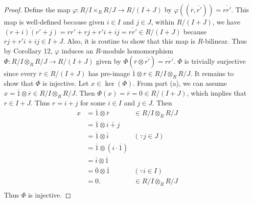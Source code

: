 \documentclass{article}
\begin{document}
\begin{enumerate}[label={(\alph*)}]
      \begin{proof}
        Define the map $\varphi:R/I\times_R R/J \rightarrow R/(I+J)$ by
        $\varphi((\overline{r},\overline{r'})) =\overline{rr'}$. This map
        is well-defined because given $i\in I$ and $j\in J$, within
        $R/(I+J)$, we have $\overline{(r+i)(r'+j)}
        =\overline{rr'+rj+r'i+ij} =\overline{rr'} \in R/(I+J)$ because
        $rj+r'i+ij\in I+J$. Also, it is routine to show that this map is
        $R$-bilinear. Thus by Corollary 12, $\varphi$ induces an $R$-module
        homomorphism $\Phi:R/I\otimes_R R/J \rightarrow R/(I+J)$ given by
        $\Phi(\overline{r}\otimes\overline{r'}) =\overline{rr'}$. $\Phi$ is
        trivially surjective since every $\overline{r}\in R/(I+J)$ has
        pre-image $\overline{1}\otimes\overline{r} \in R/I\otimes_R R/J$.
        It remains to show that $\Phi$ is injective. Let $x\in\ker(\Phi)$.
        From part (a), we can assume $x=\overline{1}\otimes\overline{r} \in
        R/I\otimes_R R/J$. Then $\Phi(x) =\overline{r}=0\in R/(I+J)$,
        which implies that $r\in I+J$. Thus $r=i+j$ for some $i\in I$ and
        $j\in J$. Then
        \begin{align*}
          x &=\overline{1}\otimes\overline{r} &\in R/I\otimes_R R/J\\
          &=\overline{1}\otimes\overline{i+j}\\
          &=\overline{1}\otimes\overline{i} &(\because j\in J)\\
          &=\overline{1}\otimes(i\cdot\overline{1})\\
          &=\overline{i}\otimes\overline{1}\\
          &=\overline{0}\otimes\overline{1} &(\because i\in I)\\
          &=0. &\in R/I\otimes_R R/J\\
        \end{align*}
        Thus $\Phi$ is injective.
      \end{proof}
  \end{enumerate}
\end{document}
